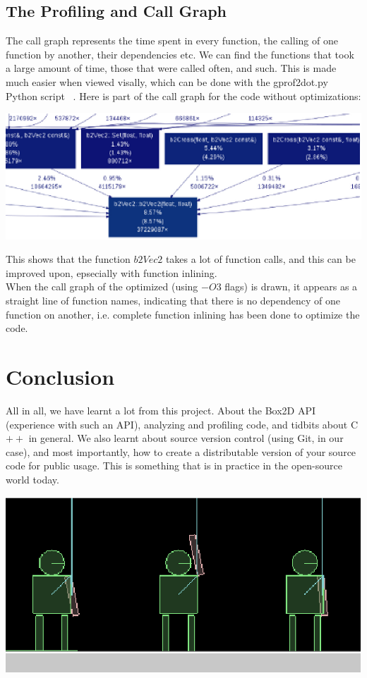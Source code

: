 \documentclass[a4paper,11pt]{article}
\begin{document}
\subsection*{The Profiling and Call Graph}
The call graph represents the time spent in every function, the calling of one function by another, their dependencies etc. We can find the functions that took a large amount of time, those that were called often, and such. This is made much easier when viewed visally, which can be done with the gprof2dot.py Python script ~\cite{py-script}. Here is part of the call graph for the code without optimizations:
\begin{center}
\includegraphics{doc/notopt.eps}
\end{center}
This shows that the function $b2Vec2$ takes a lot of function calls, and this can be improved upon, epsecially with function inlining.\\
When the call graph of the optimized (using $-O3$ flags) is drawn, it appears as a straight line of function names, indicating that there is no dependency of one function on another, i.e. complete function inlining has been done to optimize the code.


\section{Conclusion}
All in all, we have learnt a lot from this project. About the Box2D API (experience with such an API), analyzing and profiling code, and tidbits about C$++$ in general. We also learnt about source version control (using Git, in our case), and most importantly, how to create a distributable version of your source code for public usage. This is something that is in practice in the open-source world today.
\begin{center}
\includegraphics{doc/hello.eps}
\end{center}

\end{document}

